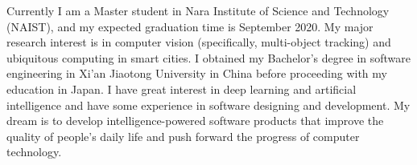 

\begin{cvparagraph}

Currently I am a Master student in Nara Institute of Science and Technology (NAIST), and my expected graduation time is September 2020. My major research interest is in computer vision (specifically, multi-object tracking) and ubiquitous computing in smart cities. I obtained my Bachelor's degree in software engineering in Xi'an Jiaotong University in China before proceeding with my education in Japan. I have great interest in deep learning and artificial intelligence and have some experience in software designing and development. My dream is to develop intelligence-powered software products that improve the quality of people's daily life and push forward the progress of computer technology.
\end{cvparagraph}
